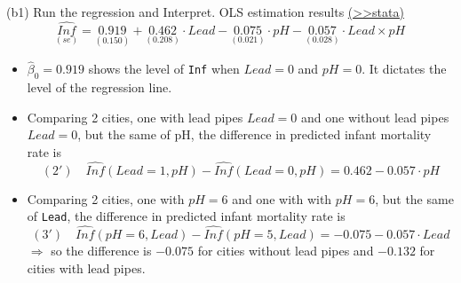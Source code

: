 \documentclass[
  10pt,
  ignorenonframetext,
]{beamer}
\providecommand{\tightlist}{%
  \setlength{\itemsep}{0pt}\setlength{\parskip}{0pt}}
\begin{document}
\begin{frame}[fragile]{(b1) Run the regression and Interpret.}
\protect\hypertarget{b1-run-the-regression-and-interpret.}{}
OLS estimation results
\footnotesize \protect\hyperlink{ux5cux23ex1-res2-regLeadpH}{(\textgreater\textgreater stata)}
\normalsize \[
\underset{(se)}{\widehat{Inf}} = \underset{(0.150)}{0.919} + \underset{(0.208)}{0.462} \cdot Lead - \underset{(0.021)}{0.075} \cdot pH - \underset{(0.028)}{0.057} \cdot Lead \times pH
\]

\small

\pause

\begin{itemize}
\tightlist
\item
  \(\hat{\beta}_0 = 0.919\) shows the level of \texttt{Inf} when
  \(Lead = 0\) and \(pH = 0\). It dictates the level of the regression
  line.
\end{itemize}

\pause

\begin{itemize}
\item
  Comparing 2 cities, one with lead pipes \(Lead = 0\) and one without
  lead pipes \(Lead = 0\), but the same of pH, the difference in
  predicted infant mortality rate is \[
  (2') \quad \widehat{Inf}(Lead=1,pH) - \widehat{Inf}(Lead=0,pH) = 0.462-0.057\cdot pH 
  \] \pause
\item
  Comparing 2 cities, one with \(pH = 6\) and one with with \(pH = 6\),
  but the same of \texttt{Lead}, the difference in predicted infant
  mortality rate is \[
  (3') \quad \widehat{Inf}(pH = 6,Lead) - \widehat{Inf}(pH = 5,Lead) = -0.075-0.057\cdot Lead 
  \] \(\Rightarrow\) so the difference is \(-0.075\) for cities without
  lead pipes and \(-0.132\) for cities with lead pipes.
\end{itemize}
\end{frame}
\end{document}
